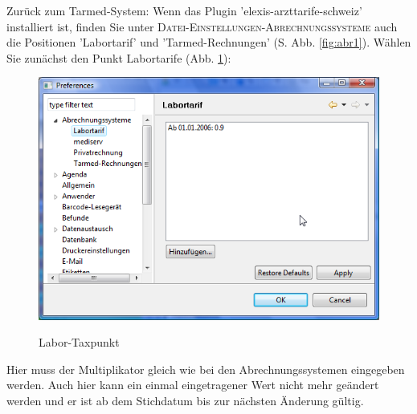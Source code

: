 \documentclass[a4paper]{scrartcl}
\begin{document}
Zurück zum Tarmed-System: Wenn das Plugin 'elexis-arzttarife-schweiz' installiert ist, finden Sie unter \textsc{Datei-Einstellungen-Abrechnungssysteme} auch die Positionen 'Labortarif' und 'Tarmed-Rechnungen' (S. Abb. \ref{fig:abr1}). Wählen Sie zunächst den Punkt Labortarife (Abb. \ref{fig:abr3}):
\begin{figure}
  \includegraphics{abr3}\\
  \caption{Labor-Taxpunkt}\label{fig:abr3}
\end{figure}
Hier muss der Multiplikator gleich wie bei den Abrechnungssystemen eingegeben werden. Auch hier kann ein einmal eingetragener Wert nicht mehr geändert werden und er ist ab dem Stichdatum bis zur nächsten Änderung gültig.

\medskip
\end{document}
